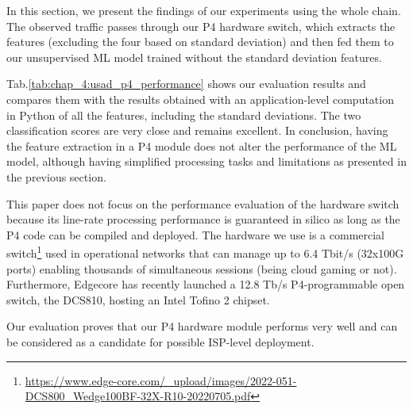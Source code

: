 In this section, we present the findings of our experiments using the whole chain. The observed traffic passes through our P4 hardware switch, which extracts the features (excluding the four based on standard deviation) and then fed them to our unsupervised ML model trained without the standard deviation features.

Tab.\ref{tab:chap_4:usad_p4_performance} shows our evaluation results and compares them with the results obtained with an application-level computation in Python of all the features, including the standard deviations. The two classification scores are very close and remains excellent. In conclusion, having the feature extraction in a P4 module does not alter the performance of the ML model, although having simplified processing tasks and limitations as presented in the previous section.


This paper does not focus on the performance evaluation of the hardware switch because its line-rate processing performance is guaranteed in silico as long as the P4 code can be compiled and deployed. The hardware we use is a commercial switch\footnote{\url{https://www.edge-core.com/_upload/images/2022-051-DCS800_Wedge100BF-32X-R10-20220705.pdf}} used in operational networks that can manage up to 6.4 Tbit/s (32x100G ports) enabling thousands of simultaneous sessions (being cloud gaming or not). Furthermore, Edgecore has recently launched a 12.8 Tb/s P4-programmable open switch, the DCS810, hosting an Intel Tofino 2 chipset.

Our evaluation proves that our P4 hardware module performs very well and can be considered %
as a candidate for possible ISP-level deployment.
